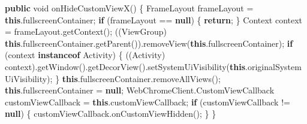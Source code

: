 \documentclass[
]{article}
\newenvironment{Shaded}{}{}
\newcommand{\BuiltInTok}[1]{\textcolor[rgb]{0.00,0.50,0.00}{#1}}
\newcommand{\ControlFlowTok}[1]{\textcolor[rgb]{0.00,0.44,0.13}{\textbf{#1}}}
\newcommand{\DataTypeTok}[1]{\textcolor[rgb]{0.56,0.13,0.00}{#1}}
\newcommand{\FunctionTok}[1]{\textcolor[rgb]{0.02,0.16,0.49}{#1}}
\newcommand{\KeywordTok}[1]{\textcolor[rgb]{0.00,0.44,0.13}{\textbf{#1}}}
\newcommand{\NormalTok}[1]{#1}
\newcommand{\OperatorTok}[1]{\textcolor[rgb]{0.40,0.40,0.40}{#1}}
\begin{document}
\begin{Shaded}
\begin{Highlighting}[]
    \KeywordTok{public} \DataTypeTok{void} \FunctionTok{onHideCustomViewX}\OperatorTok{()} \OperatorTok{\{}
\NormalTok{        FrameLayout frameLayout }\OperatorTok{=} \KeywordTok{this}\OperatorTok{.}\FunctionTok{fullscreenContainer}\OperatorTok{;}
        \ControlFlowTok{if} \OperatorTok{(}\NormalTok{frameLayout }\OperatorTok{==} \KeywordTok{null}\OperatorTok{)} \OperatorTok{\{}
            \ControlFlowTok{return}\OperatorTok{;}
        \OperatorTok{\}}
        \BuiltInTok{Context}\NormalTok{ context }\OperatorTok{=}\NormalTok{ frameLayout}\OperatorTok{.}\FunctionTok{getContext}\OperatorTok{();}
        \OperatorTok{((}\NormalTok{ViewGroup}\OperatorTok{)} \KeywordTok{this}\OperatorTok{.}\FunctionTok{fullscreenContainer}\OperatorTok{.}\FunctionTok{getParent}\OperatorTok{()).}\FunctionTok{removeView}\OperatorTok{(}\KeywordTok{this}\OperatorTok{.}\FunctionTok{fullscreenContainer}\OperatorTok{);}
        \ControlFlowTok{if} \OperatorTok{(}\NormalTok{context }\KeywordTok{instanceof}\NormalTok{ Activity}\OperatorTok{)} \OperatorTok{\{}
            \OperatorTok{((}\NormalTok{Activity}\OperatorTok{)}\NormalTok{ context}\OperatorTok{).}\FunctionTok{getWindow}\OperatorTok{().}\FunctionTok{getDecorView}\OperatorTok{().}\FunctionTok{setSystemUiVisibility}\OperatorTok{(}\KeywordTok{this}\OperatorTok{.}\FunctionTok{originalSystemUiVisibility}\OperatorTok{);}
        \OperatorTok{\}}
        \KeywordTok{this}\OperatorTok{.}\FunctionTok{fullscreenContainer}\OperatorTok{.}\FunctionTok{removeAllViews}\OperatorTok{();}
        \KeywordTok{this}\OperatorTok{.}\FunctionTok{fullscreenContainer} \OperatorTok{=} \KeywordTok{null}\OperatorTok{;}
\NormalTok{        WebChromeClient}\OperatorTok{.}\FunctionTok{CustomViewCallback}\NormalTok{ customViewCallback }\OperatorTok{=} \KeywordTok{this}\OperatorTok{.}\FunctionTok{customViewCallback}\OperatorTok{;}
        \ControlFlowTok{if} \OperatorTok{(}\NormalTok{customViewCallback }\OperatorTok{!=} \KeywordTok{null}\OperatorTok{)} \OperatorTok{\{}
\NormalTok{            customViewCallback}\OperatorTok{.}\FunctionTok{onCustomViewHidden}\OperatorTok{();}
        \OperatorTok{\}}
    \OperatorTok{\}}


\end{Highlighting}
\end{Shaded}
\end{document}

